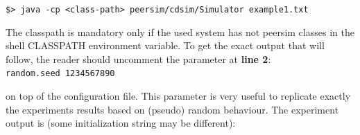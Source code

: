 \documentclass[a4paper,12pt]{article}
\begin{document}
\texttt{\footnotesize \$> java -cp <class-path> peersim/cdsim/Simulator
example1.txt}~\\
{\footnotesize \par}

The classpath is mandatory only if the used system has not peersim
classes in the shell CLASSPATH environment variable. To get the exact
output that will follow, the reader should uncomment the parameter
at \textbf{line 2}:\\


\texttt{\footnotesize random.seed 1234567890}~\\
{\footnotesize \par}

on top of the configuration file. This parameter is very useful to
replicate exactly the experiments results based on (pseudo) random
behaviour. The experiment output is (some initialization string may
be different):\\
\end{document}
